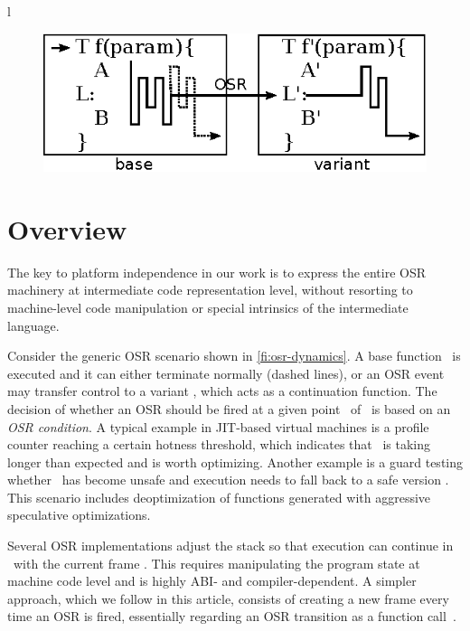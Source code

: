 l%

\ifdefined\noauthorea
\begin{figure}[t]
\begin{center}
\includegraphics[width=0.6\columnwidth]{figures/overview-osr/overview-osr.eps}
\caption{\protect}
\end{center}
\end{figure}
\fi

\section{Overview}
\label{se:overview}

The key to platform independence in our work is to express the entire OSR machinery at intermediate code representation level, without resorting to machine-level code manipulation or special intrinsics of the intermediate language. %


Consider the generic OSR scenario shown in \myfigure\ref{fi:osr-dynamics}. A base function \fbase\ is executed and it can either terminate normally (dashed lines), or an OSR event may transfer control to a variant \fvariant, which acts as a continuation function. The decision of whether an OSR should be fired at a given point \osrpoint\ of \fbase\ is based on an {\em OSR condition}. A typical example in JIT-based virtual machines is a profile counter reaching a certain hotness threshold, which indicates that \fbase\ is taking longer than expected and is worth optimizing. Another example is a guard testing whether \fbase\ has become unsafe and execution needs to fall back to a safe version \fvariant. This scenario includes deoptimization of functions generated with aggressive speculative optimizations. 

Several OSR implementations adjust the stack so that execution can continue in \fvariant\ with the current frame \cite{chambers1992design, suganuma2006region}. This requires manipulating the program state at machine code level and is highly ABI- and compiler-dependent. A simpler approach, which we follow in this article, consists of creating a new frame every time an OSR is fired, essentially regarding an OSR transition as a function call~\cite{lameed2013modular,webkit14}. 

